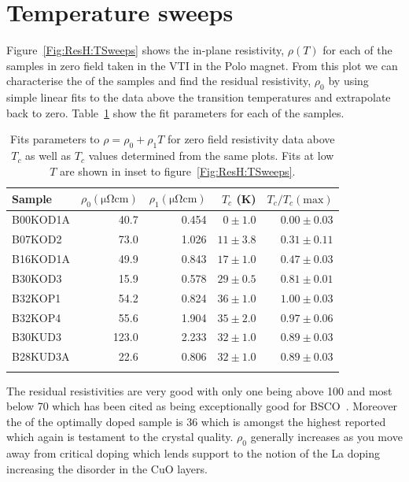 \section{Temperature sweeps}

Figure~\ref{Fig:ResH:TSweeps} shows the in-plane resistivity, $\rho(T)$ for each of the samples in zero field taken in the \ac{VTI} in the Polo magnet. From this plot we can characterise the \Tc of the samples and find the residual resistivity, $\rho_0$ by using simple linear fits to the data above the transition temperatures and extrapolate back to zero. Table~\ref{Table:ResH:TSweepFitsParams} show the fit parameters for each of the samples. 
\begin{table}
	\begin{center}
       	\caption{Fits parameters to $\rho = \rho_0 + \rho_1T$ for zero field resistivity data above $T_c$ as well as $T_c$ values determined from the same plots. Fits at low $T$ are shown in inset to figure~\ref{Fig:ResH:TSweeps}.}
		{\small \begin{tabular}[htbp]{lrrrr}
\toprule
Sample		& $\rho_0 (\unit{\micro\ohm\centi\metre})$	& $\rho_1 (\unit{\micro\ohm\centi\metre})$  & $T_c$ (\unit{\kelvin})	& $T_c/T_c(\textrm{max})$	\\
\midrule
B00KOD1A	& 40.7		& 0.454     & $0\pm1.0$	    & $0.00\pm0.03$	\\
B07KOD2		& 73.0		& 1.026     & $11\pm3.8$	& $0.31\pm0.11$	\\
B16KOD1A	& 49.9		& 0.843     & $17\pm1.0$	& $0.47\pm0.03$	\\
B30KOD3		& 15.9		& 0.578     & $29\pm0.5$	& $0.81\pm0.01$	\\
B32KOP1		& 54.2		& 0.824     & $36\pm1.0$	& $1.00\pm0.03$	\\
B32KOP4		& 55.6		& 1.904     & $35\pm2.0$	& $0.97\pm0.06$	\\
B30KUD3		& 123.0		& 2.233     & $32\pm1.0$	& $0.89\pm0.03$ \\
B28KUD3A	& 22.6		& 0.806     & $32\pm1.0$	& $0.89\pm0.03$	\\
\bottomrule
		\label{Table:ResH:TSweepFitsParams}
		\end{tabular} }
	\end{center}
\end{table}
The residual resistivities are very good with only one being above \unit{100}{\micro\ohm\centi\metre} and most below \unit{70}{\micro\ohm\centi\metre} which has been cited as being exceptionally good for \ac{BSCO}~\cite{Ando1999}. Moreover the \Tc of the optimally doped sample is \unit{36}{\kelvin} which is amongst the highest reported~\cite{Ando1999} which again is testament to the crystal quality. $\rho_0$ generally increases as you move away from critical doping which lends support to the notion of the La doping increasing the disorder in the CuO layers.

